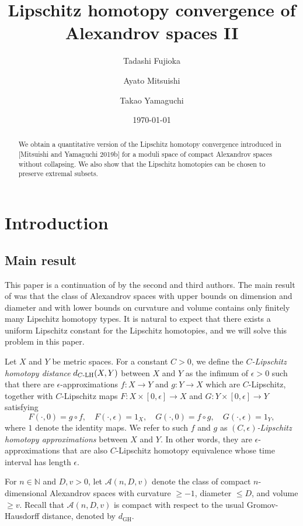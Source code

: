 \documentclass[a4paper,12pt]{amsart}
\title[Lipschitz homotopy convergence II]{Lipschitz homotopy convergence of Alexandrov spaces II}
\author[T. Fujioka]{Tadashi Fujioka}
\author[A. Mitsuishi]{Ayato Mitsuishi}
\author[T. Yamaguchi]{Takao Yamaguchi}
\date{\today}
\theoremstyle{plain}
\theoremstyle{definition}
\numberwithin{thm}{section}
\numberwithin{equation}{section}
\begin{document}
\begin{abstract}
We obtain a quantitative version of the Lipschitz homotopy convergence introduced in [Mitsuishi and Yamaguchi 2019b] for a moduli space of compact Alexandrov spaces without collapsing. 
We also show that the Lipschitz homotopies can be chosen to preserve extremal subsets.
\end{abstract}

\maketitle

\section{Introduction}

\subsection{Main result}

This paper is a continuation of \cite{MY:lip} by the second and third authors.
The main result of \cite{MY:lip} was that the class of Alexandrov spaces with upper bounds on dimension and diameter and with lower bounds on curvature and volume contains only finitely many Lipschitz homotopy types.
It is natural to expect that there exists a uniform Lipschitz constant for the Lipschitz homotopies, and we will solve this problem in this paper.

Let $X$ and $Y$ be metric spaces.
For a constant $C>0$, we define the {\it $C$-Lipschitz homotopy distance} $d_{C\mathchar`-\mathrm{LH}}(X,Y)$ between $X$ and $Y$ as the infimum of $\epsilon>0$ such that there are $\epsilon$-approximations $f:X\to Y$ and $g:Y\to X$ which are $C$-Lipschitz, together with $C$-Lipschitz maps $F:X\times [0,\epsilon]\to X$ and $G:Y\times [0,\epsilon]\to Y$ satisfying
\[F(\cdot,0)=g\circ f,\quad F(\cdot,\epsilon)=1_X,\quad G(\cdot,0)=f\circ g,\quad G(\cdot,\epsilon)=1_Y,\]
where $1$ denote the identity maps.
We refer to such $f$ and $g$ as \textit{$(C,\epsilon)$-Lipschitz homotopy approximations} between $X$ and $Y$.
In other words, they are $\epsilon$-approximations that are also $C$-Lipschitz homotopy equivalence whose time interval has length $\epsilon$.

For $n\in\mathbb N$ and $D,v>0$, let $\mathcal A(n,D,v)$ denote the class of compact $n$-dimensional Alexandrov spaces with curvature $\ge-1$, diameter $\le D$, and volume $\ge v$.
Recall that $\mathcal A(n,D,v)$ is compact with respect to the usual Gromov-Hausdorff distance, denoted by $d_\mathrm{GH}$.
\end{document}
